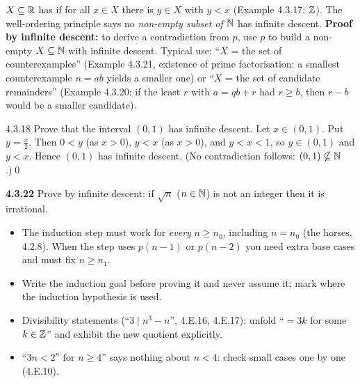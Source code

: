 \begin{key}
$X\subseteq\mathbb{R}$ has  if for all $x\in X$ there is $y\in X$ with $y<x$ (Example 4.3.17: $\mathbb{Z}$). The well-ordering principle says no \emph{non-empty subset of $\mathbb{N}$} has infinite descent. \textbf{Proof by infinite descent:} to derive a contradiction from $p$, use $p$ to build a non-empty $X\subseteq\mathbb{N}$ with infinite descent. Typical use: ``$X$ = the set of counterexamples'' (Example 4.3.21, existence of prime factorisation: a smallest counterexample $n=ab$ yields a smaller one) or ``$X$ = the set of candidate remainders'' (Example 4.3.20: if the least $r$ with $a=qb+r$ had $r\ge b$, then $r-b$ would be a smaller candidate).
\end{key}

\begin{bookex}[recommended]{4.3.18}
Prove that the interval $(0,1)$ has infinite descent.
\solution
Let $x\in(0,1)$. Put $y=\frac x2$. Then $0<y$ (as $x>0$), $y<x$ (as $x>0$), and $y<x<1$, so $y\in(0,1)$ and $y<x$. Hence $(0,1)$ has infinite descent. (No contradiction follows: $(0,1)\nsubseteq\mathbb{N}$.)\qed
\end{bookex}

\begin{trybox}[{4.3.22 \fO}]
\textbf{4.3.22} Prove by infinite descent: if $\sqrt n$ ($n\in\mathbb{N}$) is not an integer then it is irrational. 
\end{trybox}

\begin{warn}
\begin{itemize}
\item The induction step must work for \emph{every} $n\ge n_0$, including $n=n_0$ (the horses, 4.2.8). When the step uses $p(n-1)$ or $p(n-2)$ you need extra base cases and must fix $n\ge n_1$.
\item Write the induction goal before proving it and never assume it; mark where the induction hypothesis is used.
\item Divisibility statements (``$3\mid n^3-n$'', 4.E.16, 4.E.17): unfold ``$=3k$ for some $k\in\mathbb{Z}$'' and exhibit the new quotient explicitly.
\item ``$3n<2^n$ for $n\ge4$'' says nothing about $n<4$: check small cases one by one (4.E.10).
\end{itemize}
\end{warn}

